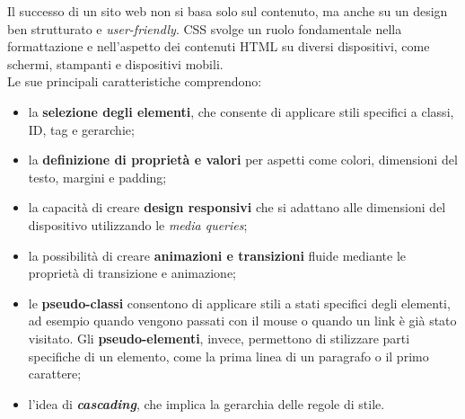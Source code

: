 Il successo di un sito web non si basa solo sul contenuto, ma anche su un design ben strutturato e \textit{user-friendly}. CSS svolge un ruolo fondamentale nella formattazione e nell'aspetto dei contenuti HTML su diversi dispositivi, come schermi, stampanti e dispositivi mobili.\\
Le sue principali caratteristiche comprendono:
\begin{itemize}
    \item la \textbf{selezione degli elementi}, che consente di applicare stili specifici a classi, ID, tag e gerarchie;\cite{CSS_creativemotions}
    \item la \textbf{definizione di proprietà e valori} per aspetti come colori, dimensioni del testo, margini e padding;\cite{CSS_creativemotions}
    \item la capacità di creare \textbf{design responsivi} che si adattano alle dimensioni del dispositivo utilizzando le \textit{media queries};\cite{CSS_ionos}
    \item la possibilità di creare \textbf{animazioni e transizioni} fluide mediante le proprietà di transizione e animazione;
    \item le \textbf{pseudo-classi} consentono di applicare stili a stati specifici degli elementi, ad esempio quando vengono passati con il mouse o quando un link è già stato visitato.\cite{CSS_html} Gli \textbf{pseudo-elementi}, invece, permettono di stilizzare parti specifiche di un elemento, come la prima linea di un paragrafo o il primo carattere;\cite{CSS_html2}
    \item l'idea di \textbf{\textit{cascading}}, che implica la gerarchia delle regole di stile.\cite{CSS_dmep}
\end{itemize}


